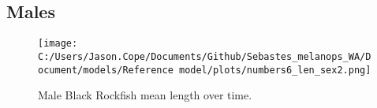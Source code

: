 \documentclass[11pt,
  english,
  letterpaper,
]{article}
\begin{document}
\clearpage

\hypertarget{males-1}{%
\subsection{Males}\label{males-1}}

\begin{figure}
\centering
\texttt{[image: C:/Users/Jason.Cope/Documents/Github/Sebastes\_melanops\_WA/Document/models/Reference model/plots/numbers6\_len\_sex2.png]}
\caption{Male Black Rockfish mean length over time.\label{fig:num_lts_males}}
\end{figure}

\clearpage
\end{document}
